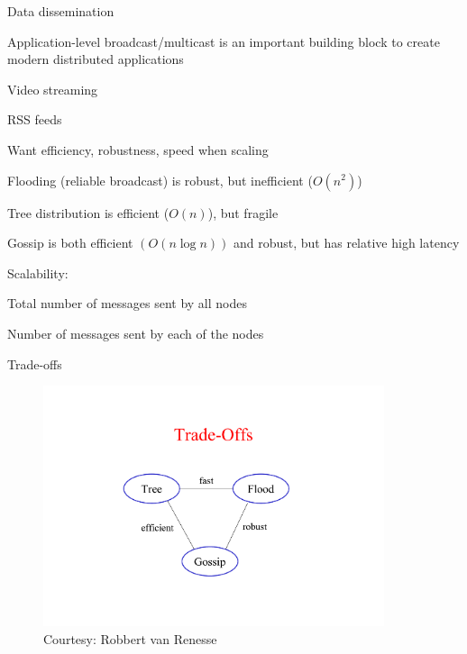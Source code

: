 \begin{frame}{Data dissemination}


\BIL
\item Application-level broadcast/multicast is an important building block
to create modern distributed applications

\BI
\item Video streaming
\item RSS feeds
\EI

\item Want efficiency, robustness, speed when scaling
\BI
\item \alert{Flooding} (reliable broadcast) is robust, but inefficient ($O(n^2)$)
\item \alert{Tree} distribution is efficient ($O(n)$), but fragile
\item \alert{Gossip} is both efficient $(O(n \log n))$ and robust, but has relative
  high latency
\EI

\item Scalability:
\BI
\item Total number of messages sent by all nodes
\item Number of messages sent by each of the nodes
\EI

\EIL


\end{frame}

\begin{frame}{Trade-offs}
	
\begin{figure}
	\includegraphics[width=10cm]{figs/05/tradeoffs}
	\caption{Courtesy: Robbert van Renesse}
\end{figure}
\end{frame}


